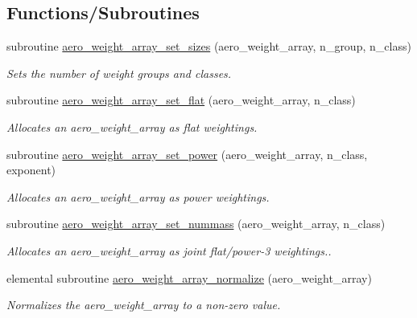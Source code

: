 \subsection*{Functions/\+Subroutines}
\begin{DoxyCompactItemize}
\item 
subroutine \mbox{\hyperlink{namespacepmc__aero__weight__array_ae550d4421da58c4fa79291f274881c13}{aero\+\_\+weight\+\_\+array\+\_\+set\+\_\+sizes}} (aero\+\_\+weight\+\_\+array, n\+\_\+group, n\+\_\+class)
\begin{DoxyCompactList}\small\item\em Sets the number of weight groups and classes. \end{DoxyCompactList}\item 
subroutine \mbox{\hyperlink{namespacepmc__aero__weight__array_a4886dd503446783dd264db9c8986d38f}{aero\+\_\+weight\+\_\+array\+\_\+set\+\_\+flat}} (aero\+\_\+weight\+\_\+array, n\+\_\+class)
\begin{DoxyCompactList}\small\item\em Allocates an {\ttfamily aero\+\_\+weight\+\_\+array} as flat weightings. \end{DoxyCompactList}\item 
subroutine \mbox{\hyperlink{namespacepmc__aero__weight__array_acee7592ccd5029f699596be244cbef2e}{aero\+\_\+weight\+\_\+array\+\_\+set\+\_\+power}} (aero\+\_\+weight\+\_\+array, n\+\_\+class, exponent)
\begin{DoxyCompactList}\small\item\em Allocates an {\ttfamily aero\+\_\+weight\+\_\+array} as power weightings. \end{DoxyCompactList}\item 
subroutine \mbox{\hyperlink{namespacepmc__aero__weight__array_a98611587acf3064873a39d6cd128d4c8}{aero\+\_\+weight\+\_\+array\+\_\+set\+\_\+nummass}} (aero\+\_\+weight\+\_\+array, n\+\_\+class)
\begin{DoxyCompactList}\small\item\em Allocates an {\ttfamily aero\+\_\+weight\+\_\+array} as joint flat/power-\/3 weightings.. \end{DoxyCompactList}\item 
elemental subroutine \mbox{\hyperlink{namespacepmc__aero__weight__array_a4faf647ac7900cdcac273e4167e8e088}{aero\+\_\+weight\+\_\+array\+\_\+normalize}} (aero\+\_\+weight\+\_\+array)
\begin{DoxyCompactList}\small\item\em Normalizes the {\ttfamily aero\+\_\+weight\+\_\+array} to a non-\/zero value. \end{DoxyCompactList}\item 

\end{DoxyCompactItemize}
